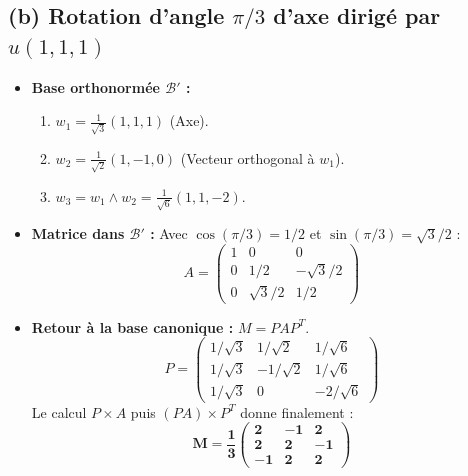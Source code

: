 \documentclass[french]{yLectureNote}
\begin{document}
\subsection*{(b) Rotation d'angle $\pi/3$ d'axe dirigé par $u(1, 1, 1)$}


\begin{itemize}
    \item \textbf{Base orthonormée $\mathcal{B}'$ :}
    \begin{enumerate}
        \item $w_1 = \frac{1}{\sqrt{3}}(1, 1, 1)$ (Axe).
        \item $w_2 = \frac{1}{\sqrt{2}}(1, -1, 0)$ (Vecteur orthogonal à $w_1$).
        \item $w_3 = w_1 \wedge w_2 = \frac{1}{\sqrt{6}}(1, 1, -2)$.
    \end{enumerate}
    \item \textbf{Matrice dans $\mathcal{B}'$ :} Avec $\cos(\pi/3) = 1/2$ et $\sin(\pi/3) = \sqrt{3}/2$ :
    \[ A = \begin{pmatrix} 1 & 0 & 0 \\ 0 & 1/2 & -\sqrt{3}/2 \\ 0 & \sqrt{3}/2 & 1/2 \end{pmatrix} \]
    \item \textbf{Retour à la base canonique :} $M = P A P^T$.
    \[ P = \begin{pmatrix} 1/\sqrt{3} & 1/\sqrt{2} & 1/\sqrt{6} \\ 1/\sqrt{3} & -1/\sqrt{2} & 1/\sqrt{6} \\ 1/\sqrt{3} & 0 & -2/\sqrt{6} \end{pmatrix} \]
    Le calcul $P \times A$ puis $(PA) \times P^T$ donne finalement :
    \[ \mathbf{M = \frac{1}{3} \begin{pmatrix} 2 & -1 & 2 \\ 2 & 2 & -1 \\ -1 & 2 & 2 \end{pmatrix}} \]
\end{itemize}

\end{document}
